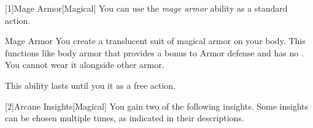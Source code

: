         [1]{Mage Armor}[Magical] You can use the \textit{mage armor} ability as a standard action.
        \begin{freeability}{Mage Armor}
            You create a translucent suit of magical armor on your body.
            This functions like body armor that provides a  bonus to Armor defense and has no .
            You cannot wear it alongside other armor.

            This ability lasts until you  it as a free action.
        \end{freeability}

        [2]{Arcane Insights}[Magical]
        You gain two of the following insights.
        Some insights can be chosen multiple times, as indicated in their descriptions.

